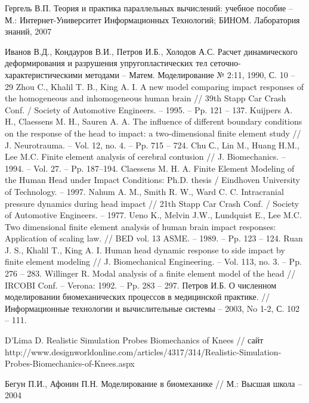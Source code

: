 \begin{thebibliography}{99}
 Гергель В.П. Теория и практика параллельных вычислений: учебное пособие – М.: Интернет-Университет Информационных Технологий; БИНОМ. Лаборатория знаний, 2007

 Иванов В.Д., Кондауров В.И., Петров И.Б., Холодов А.С. Расчет динамического деформирования и разрушения упругопластических тел сеточно-характеристическими методами – Матем. Моделирование № 2:11, 1990, С. 10 – 29
 Zhou C., Khalil T. B., King A. I. A new model comparing impact responses of the homogeneous and inhomogeneous human brain // 39th Stapp Car Crash Conf. / Society of Automotive Engineers. – 1995. – Pp. 121 – 137.
 Kuijpers A. H., Claessens M. H., Sauren A. A. The influence of different boundary conditions on the response of the head to impact: a two-dimensional finite element study // J. Neurotrauma. – Vol. 12, no. 4. – Pp. 715 – 724.
 Chu С., Lin M., Huang H.M., Lee M.C. Finite element analysis of cerebral contusion // J. Biomechanics. – 1994. – Vol. 27. – Pp. 187–194.
 Claessens M. H. A. Finite Element Modeling of the Human Head under Impact Conditions: Ph.D. thesis / Eindhoven University of Technology. – 1997.
 Nahum A. M., Smith R. W., Ward C. C. Intracranial pressure dynamics during head impact // 21th Stapp Car Crash Conf. / Society of Automotive Engineers. – 1977. 
 Ueno K., Melvin J.W., Lundquist E., Lee M.C. Two dimensional finite element analysis of human brain impact responses: Application of scaling law. // BED vol. 13 ASME. – 1989. – Pp. 123 – 124. 
 Ruan J. S., Khalil T., King A. I. Human head dynamic response to side impact by finite element modeling // J. Biomechanical Engineering. – Vol. 113, no. 3. – Pp. 276 – 283. 
 Willinger R. Modal analysis of a finite element model of the head // IRCOBI Conf. – Verona: 1992. – Pp. 283 – 297.
 Петров И.Б. О численном моделировании биомеханических процессов в медицинской практике. // Информационные технологии и вычислительные системы – 2003, No 1-2, С. 102 – 111.

 D’Lima D. Realistic Simulation Probes Biomechanics of Knees // сайт http://www.designworldonline.com/articles/4317/314/Realistic-Simulation-Probes-Biomechanics-of-Knees.aspx

 Бегун П.И., Афонин П.Н. Моделирование в биомеханике // М.: Высшая школа -- 2004


\end{thebibliography}
